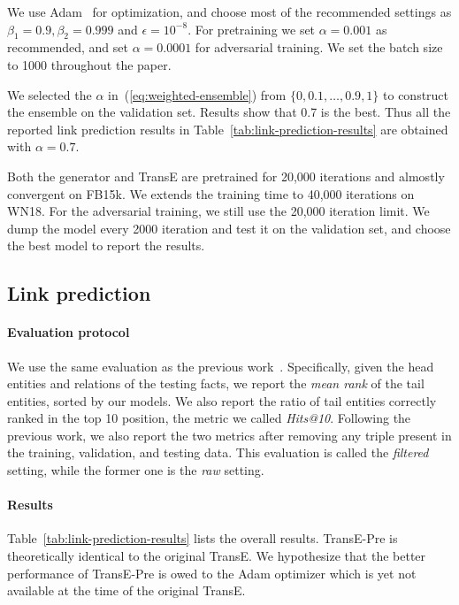 \documentclass[twocolumn,a4paper,10pt,preprint,3p]{elsarticle}
\begin{document}
We use Adam~\cite{Adam} for optimization, and choose most of the recommended settings as $\beta_1=0.9,\beta_2=0.999$ and $\epsilon=10^{-8}$. For pretraining we set $\alpha=0.001$ as recommended, and set $\alpha=0.0001$ for adversarial training. We set the batch size to 1000 throughout the paper.

We selected the $\alpha$ in~(\ref{eq:weighted-ensemble}) from $ \{0, 0.1, \dots, 0.9, 1\} $ to construct the ensemble on the validation set. Results show that 0.7 is the best. Thus all the reported link prediction results in Table~\ref{tab:link-prediction-results} are obtained with $\alpha=0.7$.

Both the generator and TransE are pretrained for 20,000 iterations and almostly convergent on FB15k. We extends the training time to 40,000 iterations on WN18. For the adversarial training, we still use the 20,000 iteration limit. We dump the model every 2000 iteration and test it on the validation set, and choose the best model to report the results.

\subsection{Link prediction}

\paragraph{Evaluation protocol} We use the same evaluation as the previous work~\cite{TransE2013,TransR2015,TransG,TransD}. Specifically, given the head entities and relations of the testing facts, we report the \emph{mean rank} of the tail entities, sorted by our models. We also report the ratio of tail entities correctly ranked in the top 10 position, the metric we called \emph{Hits@10}. Following the previous work, we also report the two metrics after removing any triple present in the training, validation, and testing data. This evaluation is called the \emph{filtered} setting, while the former one is the \emph{raw} setting.

\paragraph{Results} Table~\ref{tab:link-prediction-results} lists the overall results. TransE-Pre is theoretically identical to the original TransE. We hypothesize that the better performance of TransE-Pre is owed to the Adam optimizer which is yet not available at the time of the original TransE.
\end{document}
